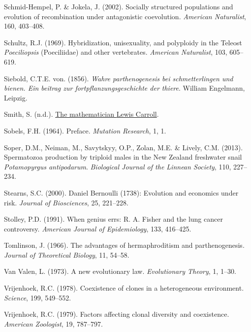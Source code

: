 \documentclass[
  letterpaper,
]{book}
\newlength{\cslhangindent}
\newenvironment{CSLReferences}[2] %
 {\begin{list}{}{%
  \setlength{\itemindent}{0pt}
  \setlength{\leftmargin}{0pt}
  \setlength{\parsep}{0pt}
  \ifodd #1
   \setlength{\leftmargin}{\cslhangindent}
   \setlength{\itemindent}{-1\cslhangindent}
  \fi
  \setlength{\itemsep}{#2\baselineskip}}}
 {\end{list}}
\begin{document}
\begin{CSLReferences}{1}{0}
Schmid-Hempel, P. \& Jokela, J. (2002). Socially structured populations
and evolution of recombination under antagonistic coevolution.
\emph{American Naturalist}, 160, 403--408.

Schultz, R.J. (1969). Hybridization, unisexuality, and polyploidy in the
{Teleost} \emph{{P}oeciliopsis} ({Poeciliidae}) and other vertebrates.
\emph{American Naturalist}, 103, 605--619.

Siebold, C.T.E. von. (1856). \emph{Wahre parthenogenesis bei
schmetterlingen und bienen. Ein beitrag zur fortpflanzungsgeschichte der
thiere}. William Engelmann, Leipzig.

Smith, S. (n.d.).
\href{http://www.herkimershideaway.org/writings/carroll.htm}{The
mathematician {Lewis Carroll}}.

Sobels, F.H. (1964). Preface. \emph{Mutation Research}, 1, 1.

Soper, D.M., Neiman, M., Savytskyy, O.P., Zolan, M.E. \& Lively, C.M.
(2013). Spermatozoa production by triploid males in the {New Zealand}
freshwater snail \emph{{P}otamopyrgus antipodarum}. \emph{Biological
Journal of the Linnean Society}, 110, 227--234.

Stearns, S.C. (2000). {Daniel Bernoulli} (1738): Evolution and economics
under risk. \emph{Journal of Biosciences}, 25, 221--228.

Stolley, P.D. (1991). When genius errs: R. A. Fisher and the lung cancer
controversy. \emph{American Journal of Epidemiology}, 133, 416--425.

Tomlinson, J. (1966). The advantages of hermaphroditism and
parthenogenesis. \emph{Journal of Theoretical Biology}, 11, 54--58.

Van Valen, L. (1973). A new evolutionary law. \emph{Evolutionary
Theory}, 1, 1--30.

Vrijenhoek, R.C. (1978). Coexistence of clones in a heterogeneous
environment. \emph{Science}, 199, 549--552.

Vrijenhoek, R.C. (1979). Factors affecting clonal diversity and
coexistence. \emph{American Zoologist}, 19, 787--797.


\end{CSLReferences}
\end{document}
